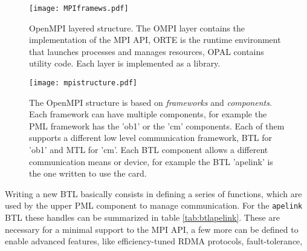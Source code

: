 \begin{figure}[htbp]
\centering
\centering
\texttt{[image: MPIframews.pdf]}
\caption{OpenMPI layered structure. The OMPI layer contains the
  implementation of the MPI API, ORTE is the runtime environment that
  launches processes and manages resources, OPAL contains utility
  code. Each layer is implemented as a library.}
\label{fig:MPIframws}
\end{figure}
\begin{figure}
\centering
\texttt{[image: mpistructure.pdf]}
\caption{The OpenMPI structure is based on \emph{frameworks} and
  \emph{components}. Each framework can have multiple
  components, for example the PML framework has the 'ob1' or the
  'cm' components. Each of them supports a different low level
  communication framework, BTL for 'ob1' and MTL for 'cm'. Each BTL
  component allows a different communication means or device, for
  example the BTL 'apelink' is the one written to use the \apenetp
  card.}
\label{fig:MPIstruct}
\end{figure}


Writing a new BTL basically consists in defining a series of functions,
which are used by the upper PML component to manage communication.
For the \texttt{apelink} BTL these handles can be summarized in table
\ref{tab:btlapelink}. These are necessary for a minimal support to the
MPI API, a few more can be defined to enable advanced features, like
efficiency-tuned RDMA protocols, fault-tolerance, \etc

